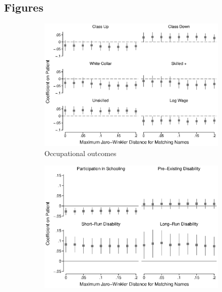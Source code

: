 \documentclass[12pt,english]{article}
\begin{document}
\begin{landscape}
\section[Figures]{Figures\label{sec:Figures}}
\begin{figure}[!ht]
\caption[Robustness to changing Jaro-Winkler distance threshold]{Robustness to changing Jaro-Winkler distance threshold}
\centering
\begin{subfigure}{0.46\textwidth}
    \centering
    \includegraphics[width=1.0\linewidth]{../output/01_paper/figure_01a.eps}
    \caption{Occupational outcomes}
    \label{fig:jw-robust-occupational}
\end{subfigure}
\begin{subfigure}{0.46\textwidth}
    \centering
    \includegraphics[width=1.0\linewidth]{../output/01_paper/figure_01b.eps}

\end{subfigure}
\end{figure}
\end{landscape}
\end{document}
